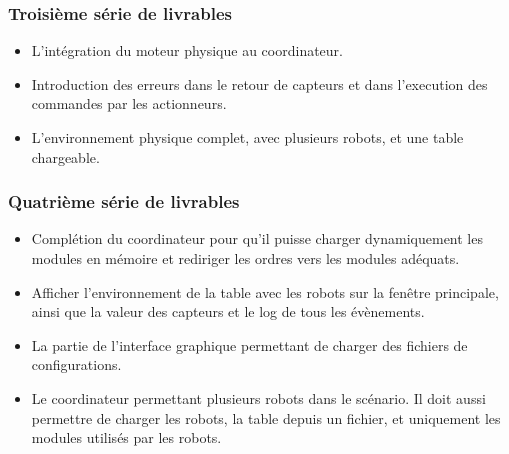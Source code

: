     \subsubsection{Troisième série de livrables}
    \begin{itemize}
        
        \item{L'intégration du moteur physique au coordinateur.}
        
        \item{Introduction des erreurs dans le retour de capteurs et dans l'execution des commandes par les actionneurs.}
        
        \item{L'environnement physique complet, avec plusieurs robots, et une table chargeable.}
        
    \end{itemize}
    \subsubsection{Quatrième série de livrables}
    \begin{itemize}
        
        \item{Complétion du coordinateur pour qu'il puisse charger dynamiquement les modules en mémoire et rediriger les ordres vers les modules adéquats.}
        
        \item{Afficher l'environnement de la table avec les robots sur la fenêtre principale, ainsi que la valeur des capteurs et le log de tous les évènements.}
        
        \item{La partie de l'interface graphique permettant de charger des fichiers de configurations.}
        
        \item{Le coordinateur permettant plusieurs robots dans le scénario. Il doit aussi permettre de charger les robots, la table depuis un fichier, et uniquement les modules utilisés par les robots.}
        
    \end{itemize}
